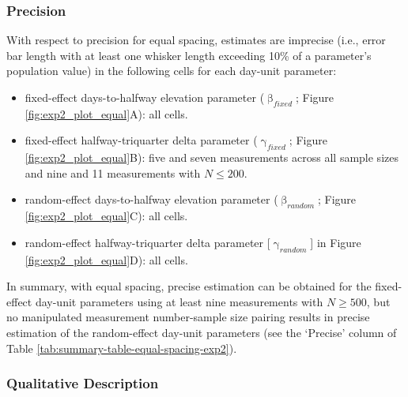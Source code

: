 \documentclass[
12pt, %
twoside,
english]{guelphthesis}
\theoremstyle{definition}
\theoremstyle{definition}
\theoremstyle{definition}
\theoremstyle{definition}
\theoremstyle{remark}
\begin{document}
\hypertarget{precision-equal-exp2}{%
\subsubsection{Precision}\label{precision-equal-exp2}}

With respect to precision for equal spacing, estimates are imprecise (i.e., error bar length with at least one whisker length exceeding 10\% of a parameter's population value) in the following cells for each day-unit parameter:
\begin{itemize}
\tightlist
\item
  fixed-effect days-to-halfway elevation parameter (\(\upbeta_{fixed}\); Figure \ref{fig:exp2_plot_equal}A): all cells.
\item
  fixed-effect halfway-triquarter delta parameter (\(\upgamma_{fixed}\); Figure \ref{fig:exp2_plot_equal}B): five and seven measurements across all sample sizes and nine and 11 measurements with \(N \le 200\).
\item
  random-effect days-to-halfway elevation parameter (\(\upbeta_{random}\); Figure \ref{fig:exp2_plot_equal}C): all cells.
\item
  random-effect halfway-triquarter delta parameter {[}\(\upgamma_{random}\){]} in Figure \ref{fig:exp2_plot_equal}D): all cells.
\end{itemize}
In summary, with equal spacing, precise estimation can be obtained for the fixed-effect day-unit parameters using at least nine measurements with \(N \ge 500\), but no manipulated measurement number-sample size pairing results in precise estimation of the random-effect day-unit parameters (see the `Precise' column of Table \ref{tab:summary-table-equal-spacing-exp2}).

\hypertarget{qualitative-equal-exp2}{%
\subsubsection{Qualitative Description}\label{qualitative-equal-exp2}}
\end{document}
